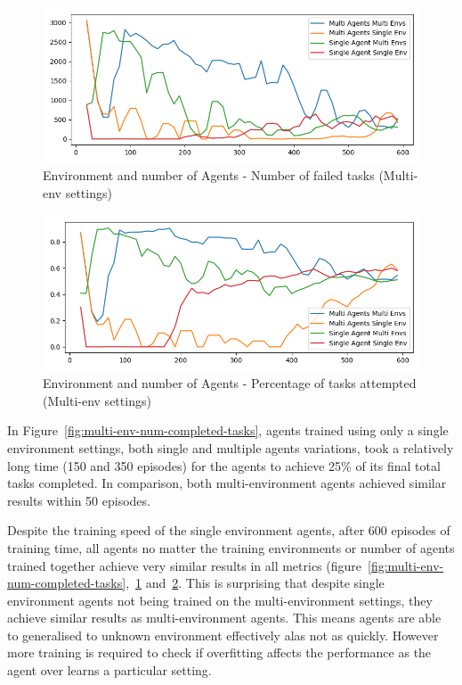 \begin{figure}[H]
    \centering
    \includegraphics[width=\linewidth]{figures/5_evaluation_figs/env_agent_num_training_fig/num_failed_tasks.png}
    \caption{Environment and number of Agents - Number of failed tasks (Multi-env settings)}
    \label{fig:multi-env-num-failed-tasks}
\end{figure}

\begin{figure}[H]
    \centering
    \includegraphics[width=\linewidth]{figures/5_evaluation_figs/env_agent_num_training_fig/percent_tasks.png}
    \caption{Environment and number of Agents - Percentage of tasks attempted (Multi-env settings)}
    \label{fig:multi-env-percent-tasks}
\end{figure}

In Figure~\ref{fig:multi-env-num-completed-tasks}, agents trained using only a single environment settings, both
single and multiple agents variations, took a relatively long time (150 and 350 episodes) for the agents to achieve 25\%
of its final total tasks completed. In comparison, both multi-environment agents achieved similar results within 50
episodes.

Despite the training speed of the single environment agents, after 600 episodes of training time, all agents no matter
the training environments or number of agents trained together achieve very similar results in all metrics
(figure~\ref{fig:multi-env-num-completed-tasks},~\ref{fig:multi-env-num-failed-tasks} and~\ref{fig:multi-env-percent-tasks}.
This is surprising that despite single environment agents not being trained on the multi-environment settings, they
achieve similar results as multi-environment agents. This means agents are able to generalised to unknown environment
effectively alas not as quickly. However more training is required to check if overfitting affects the performance as
the agent over learns a particular setting.

